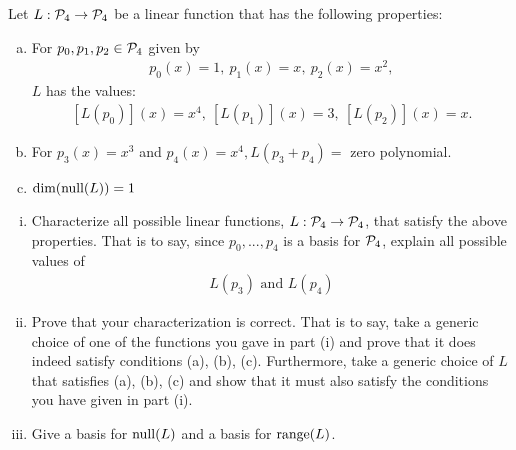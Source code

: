 \begin{question}
    \normalfont
    Let $L:\P_4\rightarrow\P_4$ be a linear function that has the following properties:
    \begin{enumerate}[(a)]
        \item For $p_0,p_1,p_2\in\P_4$ given by 
        \[
            \begin{aligned}
                p_0(x)=1,\ p_1(x)=x,\ p_2(x)=x^2,
            \end{aligned}
        \]
        $L$ has the values: 
        \[
            \begin{aligned}
                [L(p_0)](x)=x^4,\ [L(p_1)](x)=3,\ [L(p_2)](x)=x.
            \end{aligned}
        \]
        \item For $p_3(x)=x^3$ and $p_4(x)=x^4,L(p_3+p_4)=$ zero polynomial.
        \item $\dim(\nullla(L))=1$
    \end{enumerate}
    \begin{enumerate}[(i)]
        \item Characterize all possible linear functions, $L:\P_4\rightarrow\P_4$, that satisfy the above properties. That is to say, since ${p_0,...,p_4}$ is a basis for $\P_4$, explain all possible values of 
        \[
            \begin{aligned}
                L(p_3)\text{  and  }L(p_4)
            \end{aligned}
        \]
        \item Prove that your characterization is correct. That is to say, take a generic choice of one of the functions you gave in part (i) and prove that it does indeed satisfy conditions (a), (b), (c). Furthermore, take a generic choice of $L$ that satisfies (a), (b), (c) and show that it must also satisfy the conditions you have given in part (i).
        \item Give a basis for $\nullla(L)$ and a basis for $\range(L)$.
    \end{enumerate}
\end{question}